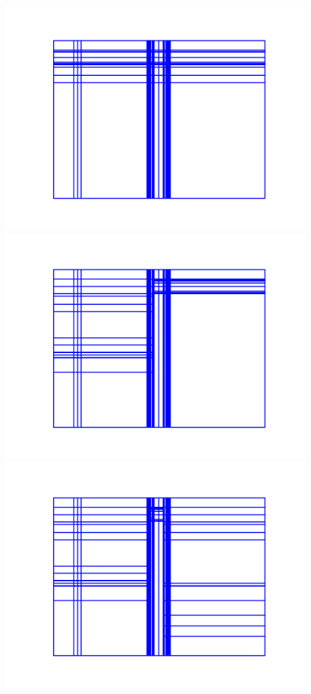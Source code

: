 \begin{figure}[h]
\centering
\includegraphics[scale=0.55]{../../figures/lvl2_suite_0.pdf}
\includegraphics[scale=0.55]{../../figures/lvl2_suite_1.pdf}
\includegraphics[scale=0.55]{../../figures/lvl2_suite_2.pdf}
\end{figure}

